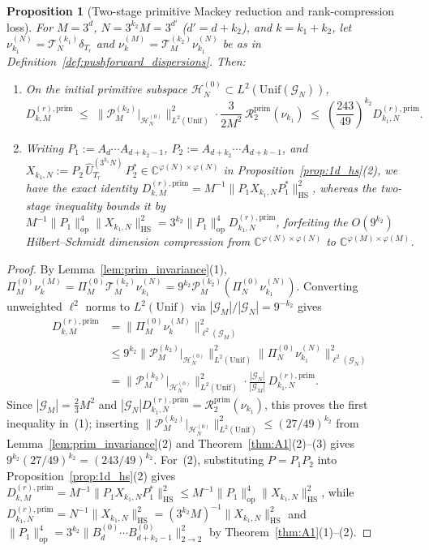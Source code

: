 \documentclass[11pt,a4paper]{article}
\numberwithin{equation}{section}
\newtheorem{proposition}[theorem]{Proposition}
\theoremstyle{definition}
\theoremstyle{remark}
\newcommand{\C}{\mathbb{C}}
\newcommand{\cG}{\mathcal{G}}
\newcommand{\cH}{\mathcal{H}}
\newcommand{\cT}{\mathcal{T}}
\newcommand{\cP}{\mathcal{P}}
\newcommand{\prim}{\mathrm{prim}}
\newcommand{\Unif}{\mathrm{Unif}}
\newcommand{\op}{\mathrm{op}}
\newcommand{\HS}{\mathrm{HS}}
\begin{document}
\begin{proposition}[Two-stage primitive Mackey reduction and rank-compression loss]\label{prop:two_stage_bound}
For $M = 3^d$, $N = 3^{k_2} M = 3^{d'}$ ($d' = d + k_2$), and $k = k_1 + k_2$, let $\nu_{k_1}^{(N)} = \cT_N^{(k_1)}\delta_{T_r}$ and $\nu_k^{(M)} = \cT_M^{(k_2)}\nu_{k_1}^{(N)}$ be as in Definition~\ref{def:pushforward_dispersions}. Then:
\begin{enumerate}[label=(\arabic*)]
\item On the initial primitive subspace $\cH_N^{(0)} \subset L^2(\Unif(\cG_N))$,
\[
D_{k, M}^{(r), \prim} \;\le\; \bigl\|\cP_M^{(k_2)}\big|_{\cH_N^{(0)}}\bigr\|_{L^2(\Unif)}^2 \cdot \frac{3}{2 M^2}\,\mathcal{R}_2^{\prim}(\nu_{k_1}) \;\le\; \left(\frac{243}{49}\right)^{k_2} D_{k_1, N}^{(r), \prim}.
\]
\item Writing $P_1 := A_d \cdots A_{d+k_2-1}$, $P_2 := A_{d+k_2}\cdots A_{d+k-1}$, and $X_{k_1, N} := P_2\,\widehat{U}_{T_r}^{(3^{k_1} N)}\,P_2^* \in \C^{\varphi(N)\times\varphi(N)}$ in Proposition~\ref{prop:1d_hs}(2), we have the exact identity $D_{k, M}^{(r), \prim} = M^{-1}\|P_1 X_{k_1, N} P_1^*\|_{\HS}^2$, whereas the two-stage inequality bounds it by $M^{-1}\|P_1\|_{\op}^4 \|X_{k_1, N}\|_{\HS}^2 = 3^{k_2}\|P_1\|_{\op}^4 D_{k_1, N}^{(r), \prim}$, forfeiting the $O(9^{k_2})$ Hilbert--Schmidt dimension compression from $\C^{\varphi(N)\times\varphi(N)}$ to $\C^{\varphi(M)\times\varphi(M)}$.
\end{enumerate}
\end{proposition}

\begin{proof}
By Lemma~\ref{lem:prim_invariance}(1), $\Pi_M^{(0)}\nu_k^{(M)} = \Pi_M^{(0)}\cT_M^{(k_2)}\nu_{k_1}^{(N)} = 9^{k_2}\cP_M^{(k_2)}(\Pi_N^{(0)}\nu_{k_1}^{(N)})$. Converting unweighted $\ell^2$ norms to $L^2(\Unif)$ via $|\cG_M| / |\cG_N| = 9^{-k_2}$ gives
\[
\begin{aligned}
D_{k, M}^{(r), \prim} &=\bigl\|\Pi_M^{(0)}\nu_k^{(M)}\bigr\|_{\ell^2(\cG_M)}^2\\
&\le 9^{k_2}\bigl\|\cP_M^{(k_2)}\big|_{\cH_N^{(0)}}\bigr\|_{L^2(\Unif)}^2 \bigl\|\Pi_N^{(0)}\nu_{k_1}^{(N)}\bigr\|_{\ell^2(\cG_N)}^2\\
&= \bigl\|\cP_M^{(k_2)}\big|_{\cH_N^{(0)}}\bigr\|_{L^2(\Unif)}^2 \cdot \frac{|\cG_N|}{|\cG_M|}\, D_{k_1, N}^{(r), \prim}.
\end{aligned}
\]
Since $|\cG_M| = \frac{2}{3}M^2$ and $|\cG_N| D_{k_1, N}^{(r),\prim} = \mathcal{R}_2^{\prim}(\nu_{k_1})$, this proves the first inequality in~(1); inserting $\|\cP_M^{(k_2)}|_{\cH_N^{(0)}}\|_{L^2(\Unif)}^2 \le (27/49)^{k_2}$ from Lemma~\ref{lem:prim_invariance}(2) and Theorem~\ref{thm:A1}(2)--(3) gives $9^{k_2}(27/49)^{k_2} = (243/49)^{k_2}$. For~(2), substituting $P = P_1 P_2$ into Proposition~\ref{prop:1d_hs}(2) gives $D_{k, M}^{(r), \prim} = M^{-1}\|P_1 X_{k_1, N} P_1^*\|_{\HS}^2 \le M^{-1}\|P_1\|_{\op}^4\|X_{k_1, N}\|_{\HS}^2$, while $D_{k_1, N}^{(r), \prim} = N^{-1}\|X_{k_1, N}\|_{\HS}^2 = (3^{k_2}M)^{-1}\|X_{k_1, N}\|_{\HS}^2$ and $\|P_1\|_{\op}^4 = 3^{k_2}\|B_d^{(0)}\cdots B_{d+k_2-1}^{(0)}\|_{2\to 2}^2$ by Theorem~\ref{thm:A1}(1)--(2).
\end{proof}
\end{document}
